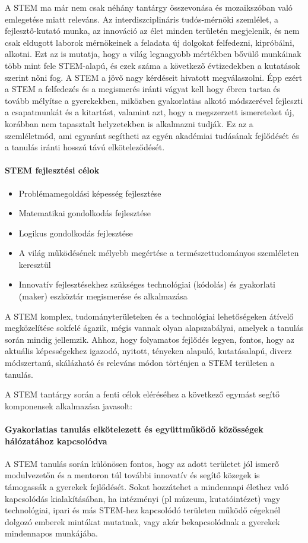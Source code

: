 A STEM ma már nem csak néhány tantárgy összevonása és  mozaikszóban való
emlegetése miatt releváns. Az interdiszciplináris tudós-mérnöki szemlélet, a
fejlesztő-kutató munka, az innováció az élet minden területén megjelenik, és
nem csak eldugott laborok mérnökeinek a feladata új dolgokat felfedezni,
kipróbálni, alkotni. Ezt az is mutatja, hogy a világ legnagyobb mértékben
bővülő munkáinak több mint fele STEM-alapú, és ezek száma a következő
évtizedekben a kutatások szerint nőni fog. A STEM a jövő nagy kérdéseit
hivatott megválaszolni. Épp ezért a STEM a felfedezés és a megismerés iránti
vágyat kell hogy ébren tartsa és tovább mélyítse a gyerekekben, miközben
gyakorlatias alkotó módszerével fejleszti a csapatmunkát és a kitartást,
valamint azt, hogy a megszerzett ismereteket új, korábban nem tapasztalt
helyzetekben is alkalmazni tudják. Ez az a szemléletmód, ami egyaránt segítheti
az egyén akadémiai tudásának fejlődését és a tanulás iránti hosszú távú
elköteleződését.

\paragraph{STEM fejlesztési célok}
\begin{itemize}
  \item Problémamegoldási képesség fejlesztése
  \item  Matematikai gondolkodás fejlesztése
  \item  Logikus gondolkodás fejlesztése
  \item  A világ működésének mélyebb megértése a természettudományos szemléleten
        keresztül
  \item  Innovatív fejlesztésekhez szükséges technológiai (kódolás) és gyakorlati
        (maker) eszköztár megismerése és alkalmazása
\end{itemize}

A STEM komplex, tudományterületeken és a technológiai lehetőségeken átívelő
megközelítése sokfelé ágazik, mégis vannak olyan alapszabályai, amelyek a
tanulás során mindig jellemzik. Ahhoz, hogy folyamatos fejlődés legyen, fontos,
hogy az aktuális képességekhez igazodó, nyitott, tényeken alapuló, kutatásalapú, diverz módszertanú, skálázható és releváns módon történjen a STEM
területen a tanulás.

A STEM tantárgy során a fenti célok eléréséhez a következő egymást segítő
komponensek alkalmazása javasolt:

\paragraph{Gyakorlatias tanulás elkötelezett és együttműködő közösségek
  hálózatához kapcsolódva}
A STEM tanulás során különösen fontos, hogy az adott területet jól ismerő
modulvezetőn és a mentoron túl további innovatív és segítő közegek is támogassák a
gyerekek fejlődését. Sokat hozzátehet a mindennapi élethez való kapcsolódás
kialakításában, ha intézményi (pl múzeum, kutatóintézet) vagy technológiai,
ipari és más STEM-hez kapcsolódó területen működő cégeknél dolgozó emberek
mintákat mutatnak, vagy akár bekapcsolódnak a gyerekek mindennapos munkájába.

